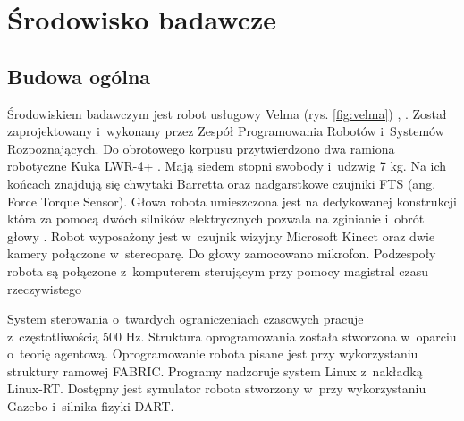 
\chapter{Środowisko badawcze\label{chap:srodowisko}}
	\section{Budowa ogólna}
	Środowiskiem badawczym jest robot usługowy Velma (rys. \ref{fig:velma}) \cite{bib:velma2}, \cite{velma}. Został zaprojektowany i~wykonany przez Zespół Programowania Robotów i~Systemów Rozpoznających\cite{bib:robotyka}. Do obrotowego korpusu przytwierdzono dwa ramiona robotyczne Kuka LWR-4+\cite{bib:kukaPage} \cite{bib:kuka}. Mają siedem stopni swobody i~udzwig 7 kg. Na ich końcach znajdują się chwytaki Barretta\cite{bib:barrett}  oraz nadgarstkowe czujniki FTS (ang. Force Torque Sensor). Głowa robota umieszczona jest na dedykowanej konstrukcji która za pomocą dwóch silników elektrycznych pozwala na zginianie i~obrót głowy\cite{bib:velmaLeb} \cite{bib:velmaKorp}. Robot wyposażony jest w~czujnik wizyjny Microsoft Kinect oraz dwie kamery połączone w~stereoparę. Do głowy zamocowano mikrofon. Podzespoły robota są połączone z~komputerem sterującym przy pomocy magistral czasu rzeczywistego
	
	System sterowania o~twardych ograniczeniach czasowych pracuje z~częstotliwością 500 Hz. Struktura oprogramowania została stworzona w~oparciu o~teorię agentową. Oprogramowanie robota pisane jest przy wykorzystaniu struktury ramowej FABRIC. Programy nadzoruje system Linux z~nakładką Linux-RT. Dostępny jest symulator robota stworzony w~przy wykorzystaniu Gazebo i~silnika fizyki DART. 
	
